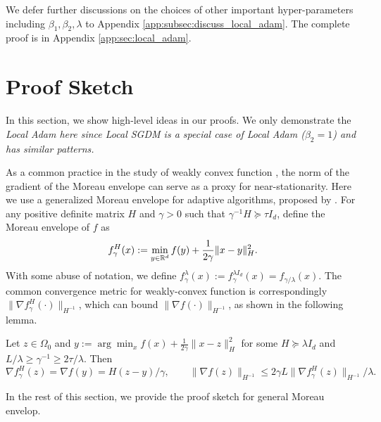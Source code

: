 \documentclass{article} %
\numberwithin{equation}{section}
\begin{document}
We defer further discussions on the choices of other important hyper-parameters including $\beta_1, \beta_2,\lambda$ to Appendix \ref{app:subsec:discuss_local_adam}.
The complete proof is in Appendix \ref{app:sec:local_adam}.

\section{Proof Sketch}\label{sec:proof}
    In this section, we show high-level ideas in our proofs.
    We only demonstrate the \em Local \em Adam here since \em Local \em SGDM is a special case of \em Local \em Adam ($\beta_2=1$) and has similar patterns.

    As a common practice in the study of weakly convex function \citep{davis2019stochastic, mai2020convergence}, the norm of the gradient of the Moreau envelope can serve as a proxy for near-stationarity.
    Here we use a generalized Moreau envelope for adaptive algorithms, proposed by \cite{alacaoglu2020convergence}.
    For any positive definite matrix $H$ and $\gamma>0$ such that $\gamma^{-1} H\succeq \tau I_d$, define the Moreau envelope of $f$ as
    \begin{equation}
        f_\gamma^H(x):= \min_{y\in \mathbb{R}^d} f(y) + \frac{1}{2\gamma}\|x-y\|_H^2.
    \end{equation}
    With some abuse of notation, we define $f_\gamma^\lambda(x):=f_\gamma^{\lambda I_d}(x)=f_{\gamma/\lambda}(x)$.
    The common convergence metric for weakly-convex function is correspondingly $\|\nabla f_\gamma^H(\cdot)\|_{H^{-1}}$, which can bound $\|\nabla f(\cdot)\|_{H^{-1}}$, as shown in the following lemma.
    \begin{lemma}\label{main:lem:moreau_env}
        Let $z\in \Omega_0$ and $y:=\arg\min_x f(x)+\frac{1}{2\gamma}\|x-z\|_H^2$ for some $H\succeq \lambda I_d$ and $L/\lambda \geq \gamma^{-1}\geq 2\tau/\lambda$. 
        Then
        \begin{equation}
            \nabla f_\gamma^H (z) = \nabla f(y) = H(z-y)/\gamma,\qquad
            \|\nabla f(z)\|_{H^{-1}}\leq 2\gamma L\|\nabla f_\gamma^H(z)\|_{H^{-1}}/\lambda.
        \end{equation}
    \end{lemma}
    In the rest of this section, we provide the proof sketch for general Moreau envelop.
\end{document}
